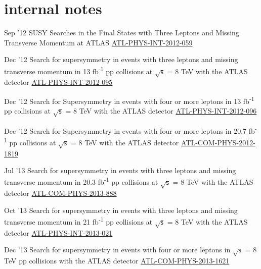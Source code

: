 \documentclass[]{cv} %
\begin{document}
\section{internal notes}
\begin{entrylist}

\entry
{Sep '12}
{{\normalfont SUSY Searches in the Final States with Three Leptons and Missing Transverse Momentum at ATLAS}}
{\href{https://cds.cern.ch/record/1482141}{ATL-PHYS-INT-2012-059}}
{\vspace*{\spacingPubs}}

\entry
{Dec '12}
{{\normalfont Search for supersymmetry in events with three leptons and missing transverse momentum in 13 fb\textsuperscript{-1} pp collisions
at $\sqrt{\mathsf{s}}$ = 8 TeV with the ATLAS detector}}
{\href{https://cds.cern.ch/record/1498390}{ATL-PHYS-INT-2012-095}}
{\vspace*{\spacingPubs}}

\entry
{Dec '12}
{{\normalfont Search for Supersymmetry in events with four or more leptons in 13 fb\textsuperscript{-1} pp collisions at $\sqrt{\mathsf{s}}$ =
8 TeV with the ATLAS detector}}
{\href{https://cds.cern.ch/record/1498627}{ATL-PHYS-INT-2012-096}}
{\vspace*{\spacingPubs}}

\entry
{Dec '12}
{{\normalfont Search for Supersymmetry in events with four or more leptons in 20.7 fb\textsuperscript{-1} pp collisions at $\sqrt{\mathsf{s}}$
= 8 TeV with the ATLAS detector}}
{\href{https://cds.cern.ch/record/1501709}{ATL-COM-PHYS-2012-1819}}
{\vspace*{\spacingPubs}}

\entry
{Jul '13}
{{\normalfont Search for supersymmetry in events with three leptons and missing transverse momentum in 20.3 fb\textsuperscript{-1} pp
collisions at $\sqrt{\mathsf{s}}$ = 8 TeV with the ATLAS detector}}
{\href{https://cds.cern.ch/record/1558985}{ATL-COM-PHYS-2013-888}}
{\vspace*{\spacingPubs}}

\entry
{Oct '13}
{{\normalfont Search for supersymmetry in events with three leptons and missing transverse momentum in 21 fb\textsuperscript{-1} pp collisions
at $\sqrt{\mathsf{s}}$ = 8 TeV with the ATLAS detector}}
{\href{https://cds.cern.ch/record/1610185}{ATL-PHYS-INT-2013-021}}
{\vspace*{\spacingPubs}}

\entry
{Dec '13}
{{\normalfont Search for supersymmetry in events with four or more leptons in $\sqrt{\mathsf{s}}$ = 8 TeV pp collisions with the ATLAS
detector}}
{\href{https://cds.cern.ch/record/1635455}{ATL-COM-PHYS-2013-1621}}
{\vspace*{\spacingPubs}}

\end{entrylist}
\fi
\end{document}
